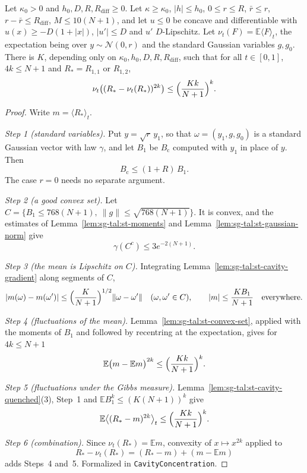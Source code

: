 \begin{theorem}\label{thm:sg-tal:st-cavity-overlaps}
  \leanok
Let $\kappa_0>0$ and $h_0,D,R,R_{\mathrm{diff}}\ge0$. Let $\kappa\ge\kappa_0$, $|h|\le h_0$, $0\le r\le R$,
$\bar r\le r$, $r-\bar r\le R_{\mathrm{diff}}$, $M\le10(N+1)$, and let $u\le0$ be concave and differentiable
with $u(x)\ge-D(1+|x|)$, $|u'|\le D$ and $u'$ $D$-Lipschitz. Let $\nu_t(F)=\mathbb E\langle F\rangle_t$, the
expectation being over $y\sim\mathcal N(0,r)$ and the standard Gaussian variables $g,g_0$. There is $K$,
depending only on $\kappa_0,h_0,D,R,R_{\mathrm{diff}}$, such that for all $t\in[0,1]$, $4k\le N+1$ and
$R_\ast=R_{1,1}$ or $R_{1,2}$,
\[
\nu_t\bigl((R_\ast-\nu_t(R_\ast))^{2k}\bigr)\le\Bigl(\frac{Kk}{N+1}\Bigr)^k .
\]
\end{theorem}
\begin{proof}
  \leanok
Write $m=\langle R_\ast\rangle_t$.

\emph{Step 1 (standard variables).} Put $y=\sqrt r\,y_1$, so that $\omega=(y_1,g,g_0)$ is a standard Gaussian
vector with law $\gamma$, and let $B_1$ be $B_{\mathrm c}$ computed with $y_1$ in place of $y$. Then
\[
B_{\mathrm c}\le(1+R)\,B_1 .
\]
The case $r=0$ needs no separate argument.

\emph{Step 2 (a good convex set).} Let $C=\{B_1\le768(N+1),\ \|g\|\le\sqrt{768(N+1)}\}$. It is convex, and
the estimates of Lemma~\ref{lem:sg-tal:st-moments} and Lemma~\ref{lem:sg-tal:st-gaussian-norm} give
\[
\gamma(C^c)\le3e^{-2(N+1)} .
\]

\emph{Step 3 (the mean is Lipschitz on $C$).} Integrating Lemma~\ref{lem:sg-tal:st-cavity-gradient} along
segments of $C$,
\[
|m(\omega)-m(\omega')|\le\Bigl(\frac K{N+1}\Bigr)^{1/2}\|\omega-\omega'\|\quad(\omega,\omega'\in C),\qquad
|m|\le\frac{KB_1}{N+1}\quad\text{everywhere}.
\]

\emph{Step 4 (fluctuations of the mean).} Lemma~\ref{lem:sg-tal:st-convex-set}, applied with the moments of $B_1$
and followed by recentring at the expectation, gives for $4k\le N+1$
\[
\mathbb E\bigl(m-\mathbb Em\bigr)^{2k}\le\Bigl(\frac{Kk}{N+1}\Bigr)^k .
\]

\emph{Step 5 (fluctuations under the Gibbs measure).} Lemma~\ref{lem:sg-tal:st-cavity-quenched}(3), Step~1 and
$\mathbb EB_1^k\le(K(N+1))^k$ give
\[
\mathbb E\bigl\langle(R_\ast-m)^{2k}\bigr\rangle_t\le\Bigl(\frac{Kk}{N+1}\Bigr)^k .
\]

\emph{Step 6 (combination).} Since $\nu_t(R_\ast)=\mathbb Em$, convexity of $x\mapsto x^{2k}$ applied to
\[
R_\ast-\nu_t(R_\ast)=(R_\ast-m)+(m-\mathbb Em)
\]
adds Steps~4 and~5.
Formalized in \texttt{CavityConcentration}.
\end{proof}

